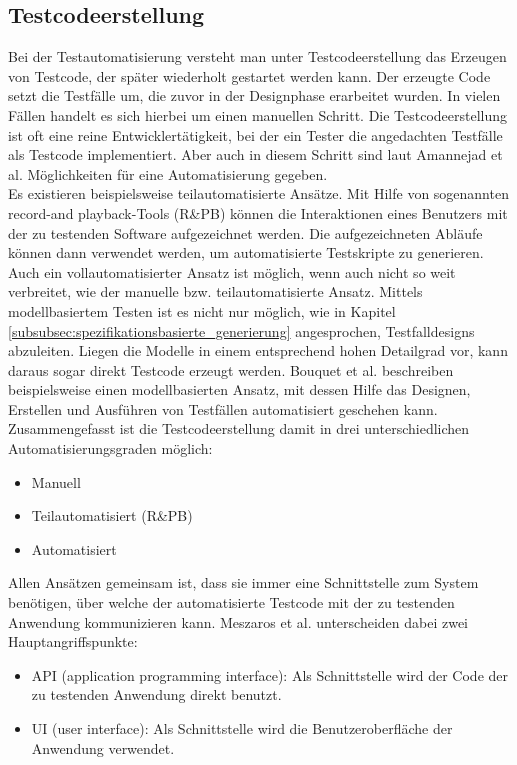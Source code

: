 \subsection{Testcodeerstellung}
\label{subsec:testcodeerstellung}
Bei der Testautomatisierung versteht man unter Testcodeerstellung das Erzeugen von Testcode, der später wiederholt gestartet werden kann. Der erzeugte Code setzt die Testfälle um, die zuvor in der Designphase erarbeitet wurden.
In vielen Fällen handelt es sich hierbei um einen manuellen Schritt. Die Testcodeerstellung ist oft eine reine Entwicklertätigkeit, bei der ein Tester die angedachten Testfälle als Testcode implementiert.
Aber auch in diesem Schritt sind laut Amannejad et al. \cite{amannejad_search-based_2014} Möglichkeiten für eine Automatisierung gegeben.\\
Es existieren beispielsweise teilautomatisierte Ansätze. Mit Hilfe von sogenannten \grq record-and playback\grq-Tools (R\&PB) können die Interaktionen eines Benutzers mit der zu testenden Software aufgezeichnet werden. Die aufgezeichneten Abläufe können dann verwendet werden, um automatisierte Testskripte zu generieren.\\
Auch ein vollautomatisierter Ansatz ist möglich, wenn auch nicht so weit verbreitet, wie der manuelle bzw. teilautomatisierte Ansatz.
Mittels modellbasiertem Testen ist es nicht nur möglich, wie in Kapitel \ref{subsubsec:spezifikationsbasierte_generierung} angesprochen, Testfalldesigns abzuleiten. Liegen die Modelle in einem entsprechend hohen Detailgrad vor, kann daraus sogar direkt Testcode erzeugt werden. Bouquet et al. \cite{bouquet_test_2008} beschreiben beispielsweise einen modellbasierten Ansatz, mit dessen Hilfe das Designen, Erstellen und Ausführen von Testfällen automatisiert geschehen kann.\\
Zusammengefasst ist die Testcodeerstellung damit in drei unterschiedlichen Automatisierungsgraden möglich:
\begin{itemize}
\item Manuell
\item Teilautomatisiert (R\&PB)
\item Automatisiert
\end{itemize}

Allen Ansätzen gemeinsam ist, dass sie immer eine Schnittstelle zum System benötigen, über welche der automatisierte Testcode mit der zu testenden Anwendung kommunizieren kann.
Meszaros et al. \cite{meszaros_agile_2003} unterscheiden dabei zwei Hauptangriffspunkte:
\begin{itemize}
\item API (application programming interface): Als Schnittstelle wird der Code der zu testenden Anwendung direkt benutzt.
\item UI (user interface): Als Schnittstelle wird die Benutzeroberfläche der Anwendung verwendet.
\end{itemize}

